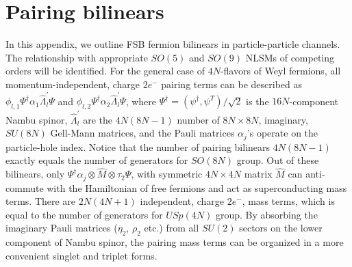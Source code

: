 \documentclass[aps,prb,amsmath,amssymb,floatfix,twocolumn]{revtex4}
\begin{document}

\appendix

\section{Pairing bilinears}\label{App1}

In this appendix, we outline FSB fermion bilinears in particle-particle channels. The relationship with appropriate $SO(5)$ and $SO(9)$ NLSMs of competing orders will be identified.
For the general case of $4N$-flavors of Weyl fermions, all momentum-independent, charge $2e^-$ pairing terms can be described as $\phi_{l,1} \Psi^\dagger \alpha_1 \hat{\Lambda}^\prime_l \Psi$ and $\phi_{l,2} \Psi^\dagger \alpha_2 \hat{\Lambda}^\prime_l \Psi$, where $\Psi^\dagger=(\psi^\dagger, \psi^T)/\sqrt{2}$ is the $16N$-component Nambu spinor, $\hat{\Lambda}^\prime_l$ are the $4N(8N-1)$ number of $8N \times 8N$, imaginary, $SU(8N)$ Gell-Mann matrices, and the Pauli matrices $\alpha_j$'s operate on the particle-hole index. Notice that the number of pairing bilinears $4N(8N-1)$ exactly equals the number of generators for $SO(8N)$ group. Out of these bilinears, only $\Psi^\dagger \alpha_j \otimes \hat{M} \otimes \tau_2 \Psi$, with symmetric $4N \times 4N$ matrix $\hat{M}$ can anti-commute with the Hamiltonian of free fermions and act as superconducting mass terms. There are $2N(4N+1)$ independent, charge $2e^-$, mass terms, which is equal to the number of generators for $USp(4N)$ group. By absorbing the imaginary Pauli matrices ($\eta_2$, $\rho_2$ etc.) from all $SU(2)$ sectors on the lower component of Nambu spinor, the pairing mass terms can be organized in a more convenient singlet and triplet forms.
\end{document}
